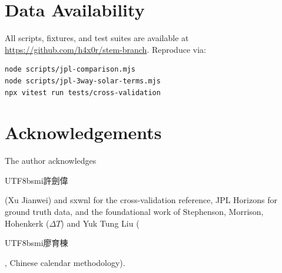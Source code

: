 \documentclass[10pt,a4paper]{article}
\newcommand{\zh}[1]{\begin{CJK}{UTF8}{bsmi}#1\end{CJK}}
\begin{document}
\section*{Data Availability}

All scripts, fixtures, and test suites are available at
\url{https://github.com/h4x0r/stem-branch}. Reproduce via:

{\small
\begin{verbatim}
node scripts/jpl-comparison.mjs
node scripts/jpl-3way-solar-terms.mjs
npx vitest run tests/cross-validation
\end{verbatim}
}

\section*{Acknowledgements}

The author acknowledges \zh{許劍偉} (Xu Jianwei) and sxwnl for the
cross-validation reference, JPL Horizons for ground truth data, and the
foundational work of Stephenson, Morrison, Hohenkerk ($\Delta T$) and
Yuk Tung Liu (\zh{廖育棟}, Chinese calendar methodology).

\end{document}

